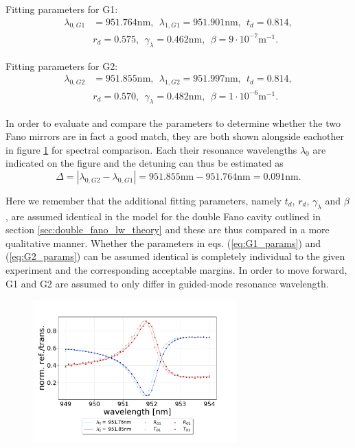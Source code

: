Fitting parameters for G1:
\begin{equation}
    \begin{split}
        \lambda_{0,G1} &= 951.764 \text{nm}, \:\: \lambda_{1,G1} = 951.901 \text{nm},\:\: t_d = 0.814, \\&r_d = 0.575, \:\:  \gamma_{\lambda} = 0.462 \text{nm},\:\: \beta = 9 \cdot 10^{-7} \text{m}^{-1}.
    \end{split}
    \label{eq:G1_params}
\end{equation}

Fitting parameters for G2:
\begin{equation}
    \begin{split}
        \lambda_{0,G2} &= 951.855 \text{nm}, \:\: \lambda_{1,G2} = 951.997 \text{nm},\:\: t_d = 0.814, \\&r_d = 0.570, \:\:  \gamma_{\lambda} = 0.482 \text{nm},\:\: \beta = 1 \cdot 10^{-6} \text{m}^{-1}.
    \end{split}
    \label{eq:G2_params}
\end{equation}

In order to evaluate and compare the parameters to determine whether the two Fano mirrors are in fact a good match, they are both shown alongside eachother in figure \ref{fig:G1_and_G2_spectral_comparison} for spectral comparison. Each their resonance wavelengths $\lambda_0$ are indicated on the figure and the detuning can thus be estimated as 
\begin{equation}
    \Delta = \left|\lambda_{0,G2} - \lambda_{0,G1}\right| = 951.855 \text{nm} - 951.764 \text{nm} = 0.091 \text{nm}.
    \label{eq:G1/G2_detuning}
\end{equation}

Here we remember that the additional fitting parameters, namely $t_d$, $r_d$, $\gamma_{\lambda}$ and $\beta$, are assumed identical in the model for the double Fano cavity outlined in section \ref{sec:double_fano_lw_theory} and these are thus compared in a more qualitative manner. Whether the parameters in eqs. (\ref{eq:G1_params}) and (\ref{eq:G2_params}) can be assumed identical is completely individual to the given experiment and the corresponding acceptable margins. In order to move forward, G1 and G2 are assumed to only differ in guided-mode resonance wavelength.

\begin{figure}[h!]
    \centering
    \includegraphics[width=0.7\textwidth]{figures/results/M3:M5/M3:M5_initial_spectra.pdf}
    \caption{}
    \label{fig:G1_and_G2_spectral_comparison}
\end{figure}

